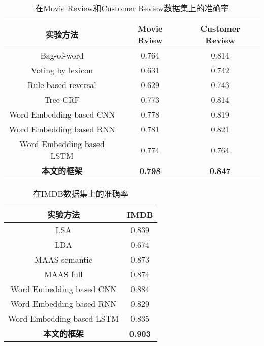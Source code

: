 \begin{table}
    \centering
    \caption{在Movie Review和Customer Review数据集上的准确率}
    \label{Table:Table1}
    \begin{tabular}{@{}ccc@{}}
        \hline
        实验方法 & Movie Rview & Customer Review \\ \hline
        Bag-of-word & 0.764 & 0.814           \\
        Voting by lexicon & 0.631 & 0.742           \\
        Rule-based reversal & 0.629 & 0.743           \\
        Tree-CRF & 0.773 & 0.814           \\
        Word Embedding based CNN & 0.778 & 0.819           \\
        Word Embedding based RNN & 0.781 & 0.821           \\
        Word Embedding based LSTM & 0.774 & 0.764           \\
        \textbf{本文的框架}    & \textbf{0.798} & \textbf{0.847}  \\ \hline
    \end{tabular}
\end{table}

\begin{table}
    \centering
    \caption{在IMDB数据集上的准确率}
    \label{Table:Table2}
    \begin{tabular}{@{}cc@{}}
        \hline
        实验方法 & IMDB           \\ \hline
        LSA & 0.839          \\
        LDA & 0.674          \\
        MAAS semantic & 0.873          \\
        MAAS full & 0.874          \\
        Word Embedding based CNN & 0.884          \\
        Word Embedding based RNN & 0.829          \\
        Word Embedding based LSTM & 0.835          \\
        \textbf{本文的框架}    & \textbf{0.903} \\ \hline
    \end{tabular}
\end{table}

